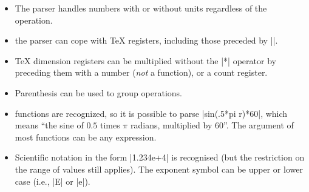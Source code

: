 \begin{command}{\pgfmathparse{}}
\begin{itemize}
  \item The parser handles numbers with or without units regardless
    of the operation.

\begin{codeexample}[post=\tt\footnotesize\pgfmathresult]
\end{codeexample}

  \item the parser can cope with \TeX{} registers, including those 
    preceded by |\the|.

    \makeatletter

\begin{codeexample}[post=\tt\footnotesize\pgfmathresult]
\pgf@x=12.34pt
\end{codeexample}

\begin{codeexample}[post=\tt\footnotesize\pgfmathresult]
\pgf@x=56.78pt
\pgfmathparse{\pgf@x+\the\pgf@x}
\end{codeexample}

  \item \TeX{} dimension registers can be multiplied without the |*| 
    operator by preceding them with a number (\emph{not} a function),
     or a count register.
	 
\begin{codeexample}[post=\tt\footnotesize\pgfmathresult]
\pgf@x=10pt
%
\end{codeexample}

  \item Parenthesis can be used to group operations.

\begin{codeexample}[post=\tt\footnotesize\pgfmathresult]
\end{codeexample}

  \item functions are recognized, so it is possible to parse
    |sin(.5*pi r)*60|, which means ``the sine of $0.5$ times $\pi$ 
    radians, multiplied by 60''. The argument of most functions can
    be any expression.

\begin{codeexample}[post=\tt\footnotesize\pgfmathresult]
\end{codeexample}

  \item Scientific notation in the form |1.234e+4| is recognised (but
  the restriction on the range of values still applies). The exponent
  symbol can be upper or lower case (i.e., |E| or |e|). 
  

\end{itemize}
\end{command}
